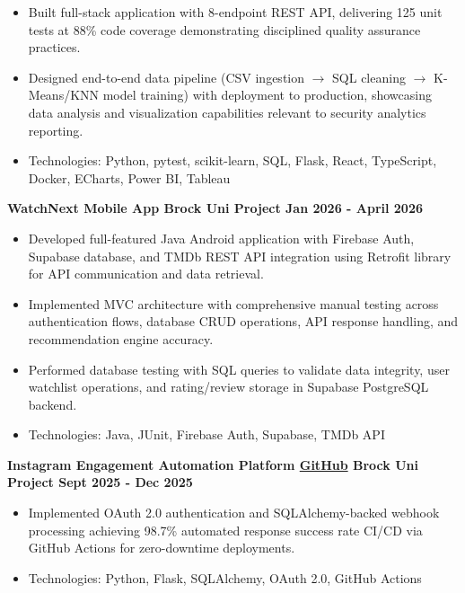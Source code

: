 \documentclass[11pt]{article}
\begin{document}
\begin{itemize}[leftmargin=1.5em, topsep=0pt, itemsep=0pt, parsep=0pt]
\item    Built full-stack application with 8-endpoint REST API, delivering 125 unit tests at 88\% code coverage demonstrating disciplined quality assurance practices.
\item    Designed end-to-end data pipeline (CSV ingestion $\rightarrow$ SQL cleaning $\rightarrow$ K-Means/KNN model training) with deployment to production, showcasing data analysis and visualization capabilities relevant to security analytics reporting.
\item    Technologies: Python, pytest, scikit-learn, SQL, Flask, React, TypeScript, Docker, ECharts, Power BI, Tableau
\end{itemize}
\textbf{WatchNext Mobile App \textbar{} Brock Uni Project \textbar{} Jan 2026 - April 2026}
\begin{itemize}[leftmargin=1.5em, topsep=0pt, itemsep=0pt, parsep=0pt]
\item    Developed full-featured Java Android application with Firebase Auth, Supabase database, and TMDb REST API integration using Retrofit library for API communication and data retrieval.
\item    Implemented MVC architecture with comprehensive manual testing across authentication flows, database CRUD operations, API response handling, and recommendation engine accuracy.
\item    Performed database testing with SQL queries to validate data integrity, user watchlist operations, and rating/review storage in Supabase PostgreSQL backend.
\item    Technologies: Java, JUnit, Firebase Auth, Supabase, TMDb API
\end{itemize}
\textbf{Instagram Engagement Automation Platform \href{https://github.com/jeff13in/Instagram-Comment-to-Get-Automation}{GitHub} \textbar{} Brock Uni Project \textbar{} Sept 2025 - Dec 2025}
\begin{itemize}[leftmargin=1.5em, topsep=0pt, itemsep=0pt, parsep=0pt]
\item    Implemented OAuth 2.0 authentication and SQLAlchemy-backed webhook processing achieving 98.7\% automated response success rate CI/CD via GitHub Actions for zero-downtime deployments.
\item    Technologies: Python, Flask, SQLAlchemy, OAuth 2.0, GitHub Actions
\end{itemize}
\end{document}
